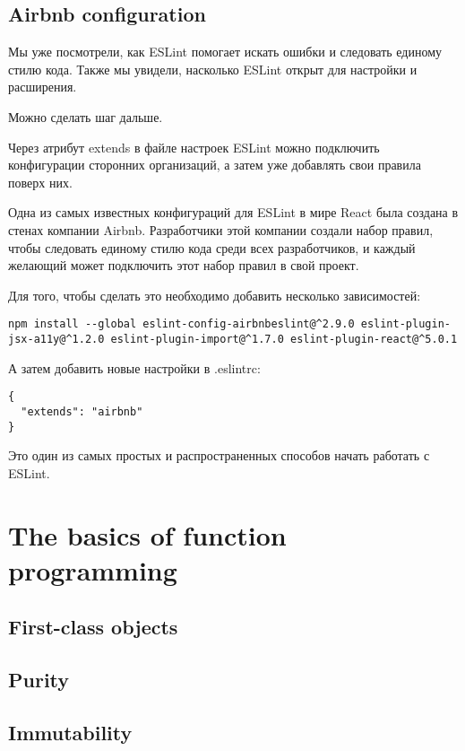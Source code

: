 \documentclass[12pt]{book}
\begin{document}
\subsection*{Airbnb configuration}

Мы уже посмотрели, как ESLint помогает искать ошибки и следовать единому стилю кода. Также мы увидели, насколько ESLint открыт для настройки и расширения.

Можно сделать шаг дальше.

Через атрибут extends в файле настроек ESLint можно подключить конфигурации сторонних организаций, а затем уже добавлять свои правила поверх них.

Одна из самых известных конфигураций для ESLint в мире React была создана в стенах компании Airbnb. Разработчики этой компании создали набор правил, чтобы следовать единому стилю кода среди всех разработчиков, и каждый желающий может подключить этот набор правил в свой проект.

Для того, чтобы сделать это необходимо добавить несколько зависимостей:

\begin{lstlisting}
npm install --global eslint-config-airbnbeslint@^2.9.0 eslint-plugin-jsx-a11y@^1.2.0 eslint-plugin-import@^1.7.0 eslint-plugin-react@^5.0.1
\end{lstlisting}

А затем добавить новые настройки в .eslintrc:

\begin{lstlisting}
{
  "extends": "airbnb"
}
\end{lstlisting}

Это один из самых простых и распространенных способов начать работать с ESLint.

\section{The basics of function programming}

\subsection*{First-class objects}

\subsection*{Purity}

\subsection*{Immutability}
\end{document}
